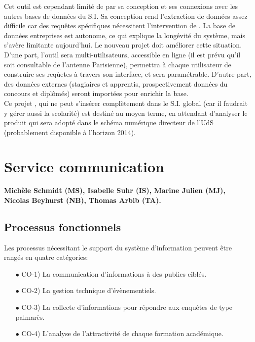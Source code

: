 \documentclass{book}
\begin{document}
Cet outil est cependant limité de par sa conception et ses connexions
avec les autres bases de données du S.I. Sa conception rend l'extraction
de données assez difficile car des requêtes spécifiques nécessitent 
l'intervention de \CK. La base de données entreprises est autonome, ce
qui explique la longévité du système, mais s'avère limitante aujourd'hui.
Le nouveau projet  doit améliorer cette situation. D'une part, l'outil
sera multi-utilisateurs, accessible en ligne (il est prévu qu'il soit 
consultable de l'antenne Parisienne), permettra à chaque utilisateur de 
construire ses reqûetes à travers son interface, et sera paramétrable. 
D'autre part, des données externes (stagiaires et apprentis, prospectivement 
données du concours et diplômés) seront importées pour enrichir la base.\\

Ce projet , qui ne peut s'insérer complètement dans le S.I. global
(car il faudrait y gérer aussi la scolarité) est destiné au moyen terme,
en attendant d'analyser le produit  qui sera adopté dans le schéma
numérique directeur de l'UdS (probablement disponible à l'horizon 2014). 

  

\section{Service communication}

\paragraph{Michèle Schmidt (MS), Isabelle Suhr (IS), Marine Julien (MJ), 
Nicolas Beyhurst (NB), Thomas Arbib (TA).}

\subsection{Processus fonctionnels}
Les processus nécessitant le support du système d'information peuvent 
être rangés en quatre catégories:
\begin{itemize}
\item[$\bullet$] CO-1) La communication d'informations à des publics ciblés.
\item[$\bullet$] CO-2) La gestion technique d'évènementiels.
\item[$\bullet$] CO-3) La collecte d'informations pour répondre aux enquêtes de type 
      palmarès.
\item[$\bullet$] CO-4) L'analyse de l'attractivité de chaque formation académique.
\end{itemize}
\bigskip
\end{document}
